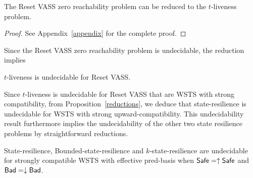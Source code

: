 \begin{theorem}\label{liveness reset}
The  Reset VASS zero reachability problem can be reduced to the $t$-liveness problem.
\end{theorem}

\begin{proof}
See Appendix~\ref{appendix} for the complete proof.
\end{proof}


Since the Reset VASS zero reachability problem is undecidable, the reduction implies 
%
\iffalse
\begin{corollary}
Reset VASS liveness is undecidable.
\end{corollary}

Since moreover liveness can be reduced to 
$t$-liveness, we deduce:
\fi
%
$t$-liveness is undecidable for Reset VASS.



\iffalse

\begin{theorem}
The downward reachability problem is reducible to the state resilience problem.
\end{theorem}

\begin{proof}
Let $s \in S$, and a downward-closed set $D$. \alain{je ne comprends pas cette "preuve"}
Take $\Safe = \emptyset$ and $\Bad = D$.
The state resilience problem on $\Safe,\Bad$ asks
whether $\Bad \cap \post^*(s) \rightarrow^* \Safe$  that is equivalent to $\Bad \cap \post^*(s) \subseteq \emptyset$.
If the answer is negative then $s \to^* \Bad$,
else $s \not\to^* \Bad$.
\end{proof}

\fi


Since $t$-liveness is undecidable for Reset VASS that are WSTS with strong compatibility, from Proposition~\ref{reductions},  we deduce that state-resilience is undecidable for WSTS with strong upward-compatibility. This undecidability result furthermore implies the undecidability of the other two state resilience problems by straightforward reductions.


\begin{theorem}\label{srp up down}
{\sc State-resilience},
{\sc Bounded-state-resilience} and
{\sc $k$-state-resilience}
are undecidable for strongly compatible WSTS with effective pred-basis
when
$\textsf{Safe}=\uparrow \textsf{Safe}$
and $\textsf{Bad}=\downarrow \textsf{Bad}$.
\end{theorem}


